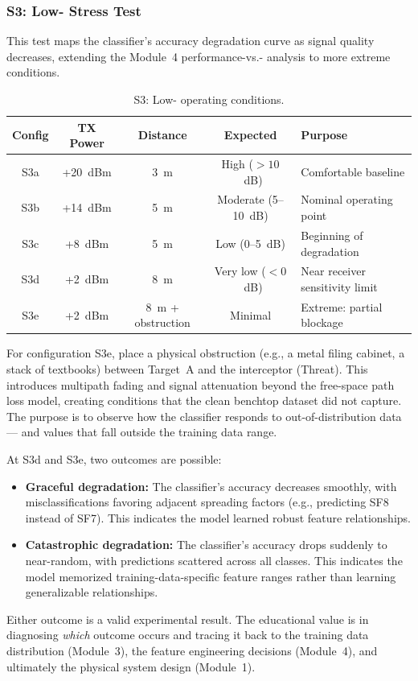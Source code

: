 \documentclass[11pt,letterpaper]{article}
\begin{document}
	\subsubsection{S3: Low-\SNR{} Stress Test}

	This test maps the classifier's accuracy degradation curve as signal quality decreases, extending the Module~4 performance-vs.-\SNR{} analysis to more extreme conditions.

	\begin{table}[ht!]
		\centering
		\caption{S3: Low-\SNR{} operating conditions.}
		\label{tab:s3}
		\renewcommand{\arraystretch}{1.3}
		\begin{tabularx}{\textwidth}{c c c c X}
			\toprule
			\textbf{Config} & \textbf{TX Power} & \textbf{Distance} & \textbf{Expected \SNR{}} & \textbf{Purpose} \\
			\midrule
			S3a & +20~dBm & 3~m & High ($>10$~dB) & Comfortable baseline \\
			S3b & +14~dBm & 5~m & Moderate (5--10~dB) & Nominal operating point \\
			S3c & +8~dBm & 5~m & Low (0--5~dB) & Beginning of degradation \\
			S3d & +2~dBm & 8~m & Very low ($<0$~dB) & Near receiver sensitivity limit \\
			S3e & +2~dBm & 8~m + obstruction & Minimal & Extreme: partial blockage \\
			\bottomrule
		\end{tabularx}
	\end{table}

	For configuration S3e, place a physical obstruction (e.g., a metal filing cabinet, a stack of textbooks) between Target~A and the interceptor (Threat). This introduces multipath fading and signal attenuation beyond the free-space path loss model, creating conditions that the clean benchtop dataset did not capture. The purpose is to observe how the classifier responds to out-of-distribution data---\RSSI{} and \SNR{} values that fall outside the training data range.

	\begin{tcolorbox}[infobox={Expected Results: Out-of-Distribution Behavior}]
		At S3d and S3e, two outcomes are possible:
		\begin{itemize}
			\item \textbf{Graceful degradation:} The classifier's accuracy decreases smoothly, with misclassifications favoring adjacent spreading factors (e.g., predicting SF8 instead of SF7). This indicates the model learned robust feature relationships.
			\item \textbf{Catastrophic degradation:} The classifier's accuracy drops suddenly to near-random, with predictions scattered across all classes. This indicates the model memorized training-data-specific feature ranges rather than learning generalizable relationships.
		\end{itemize}
		Either outcome is a valid experimental result. The educational value is in diagnosing \emph{which} outcome occurs and tracing it back to the training data distribution (Module~3), the feature engineering decisions (Module~4), and ultimately the physical system design (Module~1).
	\end{tcolorbox}
\end{document}
